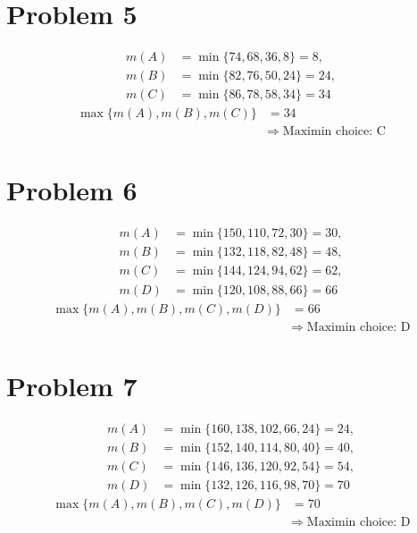 \section{Problem 5}
\[
	\begin{aligned}
	m(A) &= \min\{74,68,36,8\}=8,\\
	m(B) &= \min\{82,76,50,24\}=24,\\
	m(C) &= \min\{86,78,58,34\}=34
	\end{aligned}
	\]
	\[
	\begin{aligned}
	\max\{m(A),m(B),m(C)\} &= 34\\
	&\Rightarrow\;\text{Maximin choice: C}
	\end{aligned}
	\]

\section{Problem 6}
\[
	\begin{aligned}
	m(A) &= \min\{150,110,72,30\}=30,\\
	m(B) &= \min\{132,118,82,48\}=48,\\
	m(C) &= \min\{144,124,94,62\}=62,\\
	m(D) &= \min\{120,108,88,66\}=66
	\end{aligned}
	\]
	\[
	\begin{aligned}
	\max\{m(A),m(B),m(C),m(D)\} &= 66\\
	&\Rightarrow\;\text{Maximin choice: D}
	\end{aligned}
	\]

\section{Problem 7}
\[
	\begin{aligned}
	m(A) &= \min\{160,138,102,66,24\}=24,\\
	m(B) &= \min\{152,140,114,80,40\}=40,\\
	m(C) &= \min\{146,136,120,92,54\}=54,\\
	m(D) &= \min\{132,126,116,98,70\}=70
	\end{aligned}
	\]
	\[
	\begin{aligned}
	\max\{m(A),m(B),m(C),m(D)\} &= 70\\
	&\Rightarrow\;\text{Maximin choice: D}
	\end{aligned}
	\]

